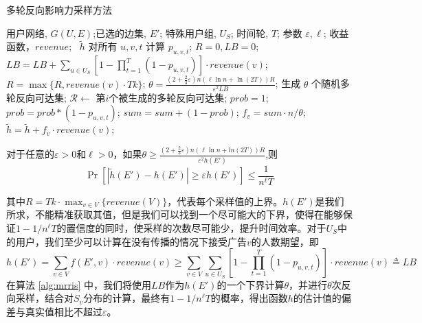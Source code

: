 \begin{algorithm}[H]
    \renewcommand{\algorithmcfname}{算法}
    \caption{多轮反向影响力采样方法\label{alg:mrris}}
    \begin{algorithmic}[1]
    \REQUIRE 用户网络, $G(U,E)$;已选的边集, $E'$; 特殊用户组, $U_S$; 时间轮, $T$; 参数 $\varepsilon,\ell$; 收益函数，$revenue$;
    \ $\tilde{h}$
    \STATE 对所有 $u,v,t$ 计算 $p_{u,v,t}$;
    \STATE $R = 0, LB = 0$;
        \STATE $LB = LB + \sum_{u \in U_S}[1- \prod_{t=1}^{T}(1-p_{u,v,t})]\cdot revenue(v)$;
        \STATE $R = \max\{R,revenue(v)\cdot Tk\}$;
    \ENDFOR
    \STATE $\theta=\frac{(2+\frac{2}{3}\varepsilon)n(\ell\ln n+\ln(2T))R}{\varepsilon^2LB}$;
    \STATE 生成 $\theta$ 个随机多轮反向可达集;
            \STATE $\mathcal{R} \leftarrow$ 第$i$个被生成的多轮反向可达集;
            \STATE $prob = 1$;
             \label{alg:mrrisline1}
                \STATE $prob = prob*(1-p_{u,v,t})$;
            \ENDFOR
            \STATE $sum=sum+(1-prob)$;\label{alg:mrrisline2}
        \ENDFOR
        \STATE $f_v = sum \cdot n / \theta$;
        \STATE $\tilde{h}= \tilde{h} + f_v\cdot revenue(v)$;
    \ENDFOR
    \end{algorithmic}
\end{algorithm}

\begin{lemma}
\label{lem:ris}
对于任意的$\varepsilon>0$和$\ell> 0$，如果$\theta \ge \frac{(2+\frac{2}{3}\varepsilon)n(\ell\ln n+ln(2T))R}{\varepsilon^2h(E')} $,则
\begin{equation}
\Pr[|\tilde{h}(E')-h(E')|\ge \varepsilon h(E')] \le \frac{1}{n^{\ell}T}
\end{equation}
\end{lemma}
\noindent 其中$R=Tk\cdot \max_{v \in V}\{revenue(V)\}$，代表每个采样值的上界。$h(E')$是我们所求，不能精准获取其值，但是我们可以找到一个尽可能大的下界，使得在能够保证$1-1/n^\ell T$的置信度的同时，使采样的次数尽可能少，提升时间效率。对于$U_S$中的用户，我们至少可以计算在没有传播的情况下接受广告$v$的人数期望，即
\begin{equation}
    h(E')=\sum_{v\in V}f(E',v)\cdot revenue(v)\ge\sum_{v\in V}\sum_{u \in U_S}[1-\prod_{t=1}^{T}(1-p_{u,v,t})]\cdot revenue(v)\triangleq LB
\end{equation}
在算法 \ref{alg:mrris} 中，我们将使用$LB$作为$h(E')$的一个下界计算$\theta$，并进行$\theta$次反向采样，结合对$S_v$分布的计算，最终有$1-1/n^\ell T$的概率，得出函数$h$的估计值的偏差与真实值相比不超过$\varepsilon$。

